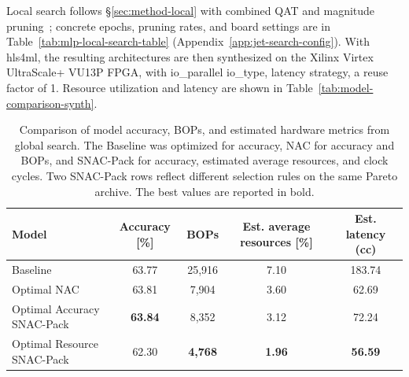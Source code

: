 \documentclass[11pt]{article}
\begin{document}
Local search follows \S\ref{sec:method-local} with combined QAT and magnitude pruning~\cite{quantization_survey,frankle2019stabilizing,frankle2018lottery}; concrete epochs, pruning rates, and board settings are in Table~\ref{tab:mlp-local-search-table} (Appendix~\ref{app:jet-search-config}).
With hls4ml, the resulting architectures are then synthesized on the Xilinx Virtex UltraScale+ VU13P FPGA, with io\_parallel io\_type, latency strategy, a reuse factor of 1.
Resource utilization and latency are shown in Table~\ref{tab:model-comparison-synth}.

\begin{table}[t]
    \caption{Comparison of model accuracy, BOPs, and estimated hardware metrics from global search.
    The Baseline was optimized for accuracy, NAC for accuracy and BOPs, and SNAC-Pack for accuracy, estimated average resources, and clock cycles.
    Two SNAC-Pack rows reflect different selection rules on the same Pareto archive.
    The best values are reported in bold.}
  \label{tab:mlp-global-comparison}
  \centering
  \footnotesize
  \begin{tabular}{lcccc}
    \toprule
    Model & Accuracy [\%] & BOPs & Est. average resources [\%]& Est. latency (cc) \\
    \midrule
    Baseline \cite{Odagiu_2024}          & 63.77 & 25{,}916 & 7.10 & 183.74 \\
    Optimal NAC \cite{Weitz_2025}      & 63.81 & 7{,}904  & 3.60   & 62.69 \\
    Optimal Accuracy SNAC-Pack & \textbf{63.84} & 8{,}352  & 3.12 & 72.24 \\
    Optimal Resource SNAC-Pack & 62.30 & \textbf{4{,}768} & \textbf{1.96} & \textbf{56.59} \\
    \bottomrule
  \end{tabular}
\end{table}
\end{document}
